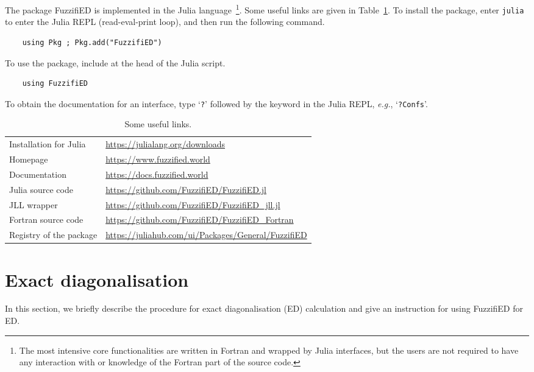 \documentclass{timesjhep}
\begin{document}
The package FuzzifiED is implemented in the Julia language~\cite{Julia}\footnote{The most intensive core functionalities are written in Fortran and wrapped by Julia interfaces, but the users are not required to have any interaction with or knowledge of the Fortran part of the source code.}. Some useful links are given in Table~\ref{tbl:link}. To install the package, enter \lstinline|julia| to enter the Julia REPL (read-eval-print loop), and then run the following command.
\begin{lstlisting}
    using Pkg ; Pkg.add("FuzzifiED")
\end{lstlisting}
To use the package, include at the head of the Julia script.
\begin{lstlisting}
    using FuzzifiED
\end{lstlisting}
To obtain the documentation for an interface, type `\lstinline|?|' followed by the keyword in the Julia REPL, \textit{e.g.}, `\lstinline|?Confs|'.

\begin{table}[htbp]
    \centering
    \begin{tabular}{l|l}
        \hline\hline
        Installation for Julia&\url{https://julialang.org/downloads}\\
        Homepage&\url{https://www.fuzzified.world}\\
        Documentation&\url{https://docs.fuzzified.world}\\
        Julia source code&\url{https://github.com/FuzzifiED/FuzzifiED.jl}\\
        JLL wrapper&\url{https://github.com/FuzzifiED/FuzzifiED_jll.jl}\\
        Fortran source code&\url{https://github.com/FuzzifiED/FuzzifiED_Fortran}\\
        Registry of the package&\url{https://juliahub.com/ui/Packages/General/FuzzifiED}\\
        \hline\hline
    \end{tabular}
    \caption{Some useful links.}
    \label{tbl:link}
\end{table}

\section{Exact diagonalisation}
\label{sec:ed}

In this section, we briefly describe the procedure for exact diagonalisation (ED) calculation and give an instruction for using FuzzifiED for ED.
\end{document}
